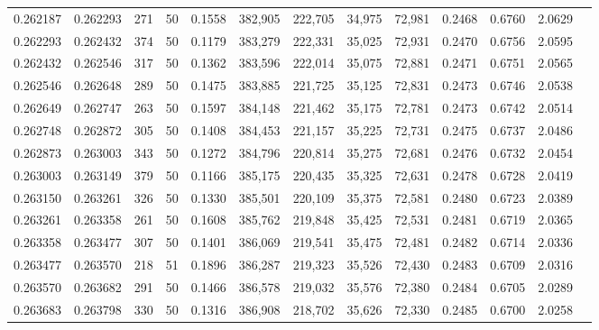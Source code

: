 \begin{tabular}{rrrrrrrrrrrrr}
0.262187 & 0.262293 &   271 &  50 &                                     0.1558 & 382,905 & 222,705 &  34,975 &  72,981 & 0.2468 & 0.6760 & 2.0629 \\
0.262293 & 0.262432 &   374 &  50 &                                     0.1179 & 383,279 & 222,331 &  35,025 &  72,931 & 0.2470 & 0.6756 & 2.0595 \\
0.262432 & 0.262546 &   317 &  50 &                                     0.1362 & 383,596 & 222,014 &  35,075 &  72,881 & 0.2471 & 0.6751 & 2.0565 \\
0.262546 & 0.262648 &   289 &  50 &                                     0.1475 & 383,885 & 221,725 &  35,125 &  72,831 & 0.2473 & 0.6746 & 2.0538 \\
0.262649 & 0.262747 &   263 &  50 &                                     0.1597 & 384,148 & 221,462 &  35,175 &  72,781 & 0.2473 & 0.6742 & 2.0514 \\
0.262748 & 0.262872 &   305 &  50 &                                     0.1408 & 384,453 & 221,157 &  35,225 &  72,731 & 0.2475 & 0.6737 & 2.0486 \\
0.262873 & 0.263003 &   343 &  50 &                                     0.1272 & 384,796 & 220,814 &  35,275 &  72,681 & 0.2476 & 0.6732 & 2.0454 \\
0.263003 & 0.263149 &   379 &  50 &                                     0.1166 & 385,175 & 220,435 &  35,325 &  72,631 & 0.2478 & 0.6728 & 2.0419 \\
0.263150 & 0.263261 &   326 &  50 &                                     0.1330 & 385,501 & 220,109 &  35,375 &  72,581 & 0.2480 & 0.6723 & 2.0389 \\
0.263261 & 0.263358 &   261 &  50 &                                     0.1608 & 385,762 & 219,848 &  35,425 &  72,531 & 0.2481 & 0.6719 & 2.0365 \\
0.263358 & 0.263477 &   307 &  50 &                                     0.1401 & 386,069 & 219,541 &  35,475 &  72,481 & 0.2482 & 0.6714 & 2.0336 \\
0.263477 & 0.263570 &   218 &  51 &                                     0.1896 & 386,287 & 219,323 &  35,526 &  72,430 & 0.2483 & 0.6709 & 2.0316 \\
0.263570 & 0.263682 &   291 &  50 &                                     0.1466 & 386,578 & 219,032 &  35,576 &  72,380 & 0.2484 & 0.6705 & 2.0289 \\
0.263683 & 0.263798 &   330 &  50 &                                     0.1316 & 386,908 & 218,702 &  35,626 &  72,330 & 0.2485 & 0.6700 & 2.0258 \\

\end{tabular}
